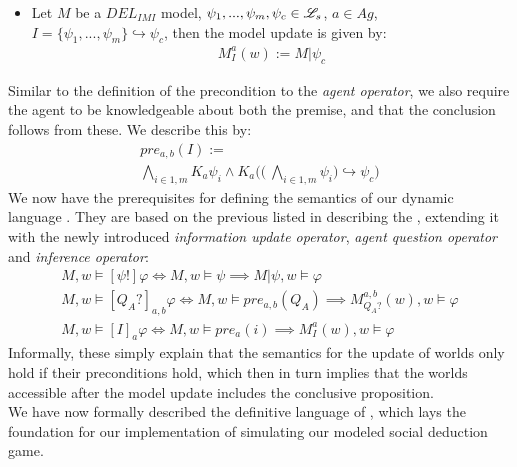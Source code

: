 \begin{itemize}
	\item Let $M$ be a $DEL_{IMI}$ model, $\psi_1,...,\psi_m, \psi_c \in \mathscr{L}_s$, $a\in Ag$, $I=\{\psi_1,...,\psi_m\} \hookrightarrow \psi_c$, then the model update is given by: 
	\begin{gather}
		M^a_I(w) := M|\psi_c
	\end{gather}
\end{itemize} 
Similar to the definition of the precondition to the \textit{agent operator}, we also require the agent to be knowledgeable about both the premise, and that the conclusion follows from these. We describe this by:
\begin{gather}
	\nonumber pre_{a,b}(I) := \\ \bigwedge\limits_{i\in1,m}K_a\psi_i \land K_a\Biggl(\Biggl(\:\bigwedge\limits_{i\in 1,m}\psi_i\Biggr) \hookrightarrow \psi_c \Biggr)
\end{gather}
We now have the prerequisites for defining the semantics of our dynamic language \dynlang. They are based on the previous listed in  describing the \staticlang, extending it with the newly introduced \textit{information update operator}, \textit{agent question operator} and \textit{inference operator}:
\begin{gather}
	M, w \models [\psi!]\varphi \iff M, w \models \psi \implies M|\psi, w \models \varphi \\
	M, w \models [Q_A?]_{a,b}\varphi \iff M, w \models pre_{a,b}(Q_A) \implies M^{a,b}_{Q_A?}(w), w \models \varphi \\
	M, w \models [I]_a\varphi \iff M, w \models pre_a(i) \implies M^a_I(w), w \models \varphi
\end{gather}
Informally, these simply explain that the semantics for the update of worlds only hold if their preconditions hold, which then in turn implies that the worlds accessible after the model update includes the conclusive proposition. \\

We have now formally described the definitive language of \dynlang, which lays the foundation for our  implementation of simulating our modeled social deduction game. 


